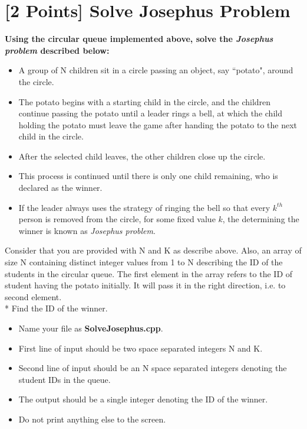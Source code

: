 \documentclass[14pt]{article}
\begin{document}
\section{[2 Points] Solve Josephus Problem}

\textbf{Using the circular queue implemented above, solve the \textit{Josephus problem} described below:}
\begin{itemize}
    \item A group of N children sit in a circle passing an object, say ``potato", around the circle.
    \item The potato begins with a starting child in the circle, and the children continue passing the potato until a leader rings a bell, at which the child holding the potato must leave the game after handing the potato to the next child in the circle.
    \item After the selected child leaves, the other children close up the circle.
    \item This process is continued until there is only one child remaining, who is declared as the winner.
    \item If the leader always uses the strategy of ringing the bell so that every $k^{th}$ person is removed from the circle, for some fixed value $k$, the determining the winner is known as \textit{Josephus problem}.
\end{itemize}

Consider that you are provided with N and K as describe above. Also, an array of size N containing distinct integer values from 1 to N describing the ID of the students in the circular queue.
The first element in the array refers to the ID of student having the potato initially. It will pass it in the right direction, i.e. to second element. \\*
Find the ID of the winner.
\begin{itemize}
    \item Name your file as \textbf{SolveJosephus.cpp}.
    \item First line of input should be two space separated integers N and K.
    \item Second line of input should be an N space separated integers denoting the student IDs in the queue.
    \item The output should be a single integer denoting the ID of the winner.
    \item Do not print anything else to the screen.
\end{itemize}
\end{document}

